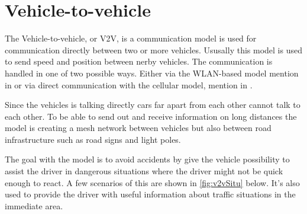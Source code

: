 \section{Vehicle-to-vehicle} \label{v2vSec}
The Vehicle-to-vehicle, or V2V, is a communication model is used for communication directly between two or more vehicles. Ususally this model is used to send speed and position between nerby vehicles. The communication is handled in one of two possible ways. Either via the WLAN-based model mention in  or via direct communication with the cellular model, mention in .

\bigskip

Since the vehicles is talking directly cars far apart from each other cannot talk to each other. To be able to send out and receive information on long distances the model is creating a mesh network between vehicles but also between road infrastructure such as road signs and light poles.

\bigskip

The goal with the model is to avoid accidents by give the vehicle possibility to assist the driver in dangerous situations where the driver might not be quick enough to react. A few scenarios of this are shown in \cref{fig:v2vSitu} below. It's also used to provide the driver with useful information about traffic situations in the immediate area. \cite{gsma}

